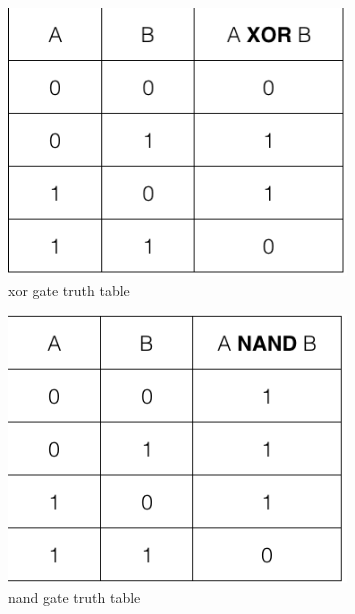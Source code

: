 \documentclass[pdftex,12pt,a4paper]{article}
\begin{document}
    \begin{figure}[H]
    	\centering
    	\includegraphics[width=0.8\textwidth]{truth tables/xor.png}	
    	\caption{xor gate truth table}
    	\label{xor gate truth table}
    \end{figure}
    
    \begin{figure}[H]
    	\centering
    	\includegraphics[width=0.8\textwidth]{truth tables/nand.png}	
    	\caption{nand gate truth table}
    	\label{nand gate truth table}
    \end{figure}
    
\end{document}
